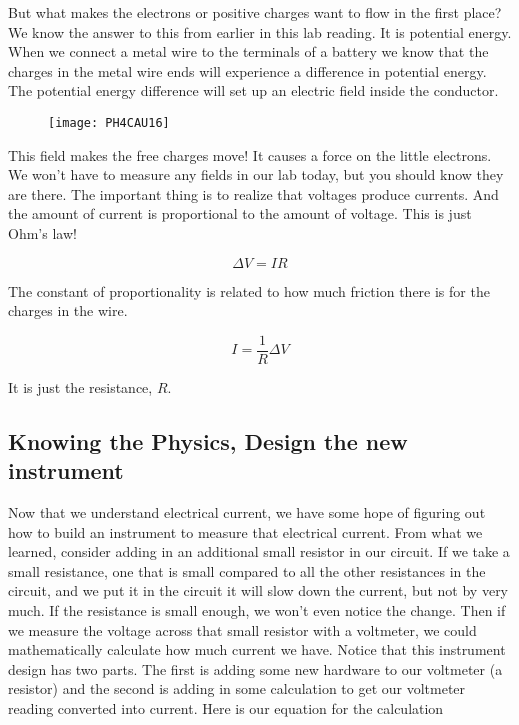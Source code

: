 But what makes the electrons or positive charges want to flow in the first place? We know the answer to this from earlier in this lab reading. It is potential energy. When we connect a metal wire to the terminals of a battery we know that the charges in the metal wire ends will experience a difference in potential energy. The potential energy difference will set up an electric field inside the conductor. 

\begin{figure}[h!]
	\centering
    \texttt{[image: PH4CAU16]}
\end{figure}

This field makes the free charges move! It causes a force on the little electrons. We won't have to measure any fields in our lab today, but you should know they are there. The important thing is to realize that voltages produce currents. And the amount of current is proportional to the amount of
voltage. This is just Ohm's law! 

\begin{equation*}
	\Delta V=IR
\end{equation*}

The constant of proportionality is related to how much friction there is for the charges in the wire.

\begin{equation*}
	I=\frac{1}{R}\Delta V
\end{equation*}

It is just the resistance, $R$.\ 

\subsection{Knowing the Physics, Design the new instrument}

Now that we understand electrical current, we have some hope of figuring out how to build an instrument to measure that electrical current. From what we learned, consider adding in an additional small resistor in our circuit. If we take a small resistance, one that is small compared to all the other resistances in the circuit, and we put it in the circuit it will slow down the current, but not by very much. If the resistance is small enough, we won't even notice the change. Then if we measure the voltage across that small resistor with a voltmeter, we could mathematically calculate how much current we have. Notice that this instrument design has two parts. The first is adding some new hardware to our voltmeter (a resistor) and the second is adding in some calculation to get our voltmeter reading converted into current. Here is our equation for the calculation

